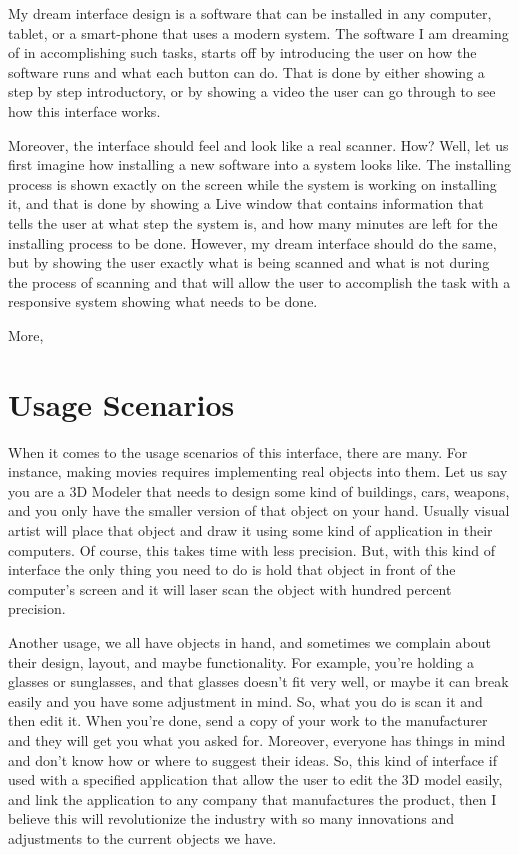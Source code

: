 \documentclass[12pt, oneside]{amsart}   	%
\begin{document}
My dream interface design is a software that can be installed in any computer, tablet, or a smart-phone that uses a modern system.  The software I am dreaming of in accomplishing such tasks, starts off by introducing the user on how the software runs and what each button can do.  That is done by either showing a step by step introductory, or by showing a video the user can go through to see how this interface works.  

Moreover, the interface should feel and look like a real scanner.  How?  Well, let us first imagine how installing a new software into a system looks like. The installing process is shown exactly on the screen while the system is working on installing it, and that is done by showing a Live window that contains information that tells the user at what step the system is, and how many minutes are left for the installing process to be done.   However, my dream interface should do the same, but by showing the user exactly what is being scanned and what is not during the process of scanning and that will allow the user to accomplish the task with a responsive system showing what needs to be done.  

More, 
\section{Usage Scenarios}

When it comes to the usage scenarios of this interface, there are many.  For instance, making movies requires implementing real objects into them. Let us say you are a 3D Modeler that needs to design some kind of buildings, cars, weapons, and you only have the smaller version of that object on your hand. Usually visual artist will place that object and draw it using some kind of application in their computers. Of course, this takes time with less precision.  But, with this kind of interface the only thing you need to do is hold that object in front of the computer's screen and it will laser scan the object with hundred percent precision.  

Another usage, we all have objects in hand, and sometimes we complain about their design, layout, and maybe functionality. For example, you're holding a glasses or sunglasses, and that glasses doesn't fit very well, or maybe it can break easily and you have some adjustment in mind. So, what you do is scan it and then edit it.  When you're done, send a copy of your work to the manufacturer and they will get you what you asked for.  Moreover, everyone has things in mind and don't know how or where to suggest their ideas.  So, this kind of interface if used with a specified application that allow the user to edit the 3D model easily, and link the application to any company that manufactures the product, then I believe this will revolutionize the industry with so many innovations and adjustments to the current objects we have.  
\end{document}
